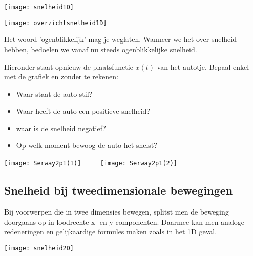 \documentclass{ximera}
\begin{document}
\begin{image}
\texttt{[image: snelheid1D]}

\end{image}

\begin{image}
\texttt{[image: overzichtsnelheid1D]}

\end{image}

\begin{remark}
	Het woord 'ogenblikkelijk' mag je weglaten. Wanneer we het over snelheid hebben, bedoelen we vanaf nu steeds ogenblikkelijke snelheid.
\end{remark}

\begin{exercise}
Hieronder staat opnieuw de plaatsfunctie \(x(t)\) van het autotje. Bepaal enkel met de grafiek en zonder te rekenen: 
\begin{itemize}
	\item Waar staat de auto stil? 
	\item Waar heeft de auto een positieve snelheid?
	\item waar is de snelheid negatief? 
	\item Op welk moment bewoog de auto het snelst? 
\end{itemize}

\begin{image}
	\texttt{[image: Serway2p1(1)]}
	$\qquad$   %
	\texttt{[image: Serway2p1(2)]}
	\end{image}
	
\end{exercise}

\subsection*{Snelheid bij tweedimensionale bewegingen}

Bij voorwerpen die in twee dimensies bewegen, splitst men de beweging doorgaans op in loodrechte x- en y-componenten. Daarmee kan men analoge redeneringen en gelijkaardige formules maken zoals in het 1D geval.

\begin{image}
\texttt{[image: snelheid2D]}

\end{image}

	
\end{document}

